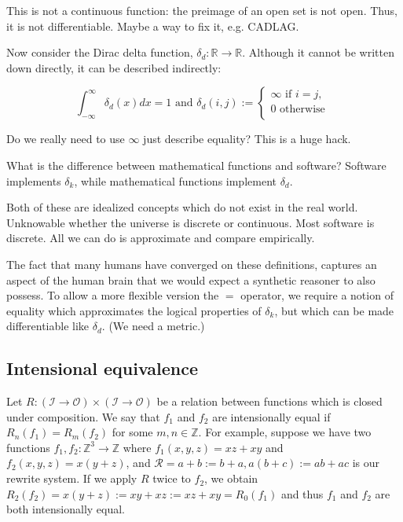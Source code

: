\documentclass[11pt]{article}
\begin{document}
    This is not a continuous function: the preimage of an open set is not open. Thus, it is not differentiable. Maybe a way to fix it, e.g. CADLAG.

    Now consider the Dirac delta function, $\delta_d: \mathbb{R} \rightarrow \mathbb{R}$. Although it cannot be written down directly, it can be described indirectly:

    $$
    \int_{-\infty}^{\infty} \delta_d (x)dx = 1 \text{ and } \delta_d(i, j) :=
    \begin{cases}
        \infty \text{ if } i = j, \\
        0 \text{ otherwise }\\
    \end{cases}
    $$

    Do we really need to use $\infty$ just describe equality? This is a huge hack.

    What is the difference between mathematical functions and software? Software implements $\delta_k$, while mathematical functions implement $\delta_d$.

    Both of these are idealized concepts which do not exist in the real world. Unknowable whether the universe is discrete or continuous. Most software is discrete. All we can do is approximate and compare empirically.

    The fact that many humans have converged on these definitions, captures an aspect of the human brain that we would expect a synthetic reasoner to also possess. To allow a more flexible version the $=$ operator, we require a notion of equality which approximates the logical properties of $\delta_k$, but which can be made differentiable like $\delta_d$. (We need a metric.)


    \subsection{Intensional equivalence}\label{subsec:intensional-equivalence}

    Let $R: (\mathcal{I} \rightarrow \mathcal{O}) \times (\mathcal{I}\rightarrow \mathcal{O})$ be a relation between functions which is closed under composition. We say that $f_1$ and $f_2$ are intensionally equal if $R_n(f_1)=R_m(f_2)$ for some $m,n \in \mathbb{Z}$. For example, suppose we have two functions $f_1, f_2: \mathbb{Z}^3 \rightarrow \mathbb{Z}$ where $f_1(x, y, z)=xz + xy$ and $f_2(x, y, z)=x(y + z)$, and $\mathcal{R}={a + b := b + a, a(b + c) := ab + ac}$ is our rewrite system. If we apply $R$ twice to $f_2$, we obtain $R_2(f_2)=x(y + z):=xy + xz:=xz + xy=R_0(f_1)$ and thus $f_1$ and $f_2$ are both intensionally equal.
\end{document}
